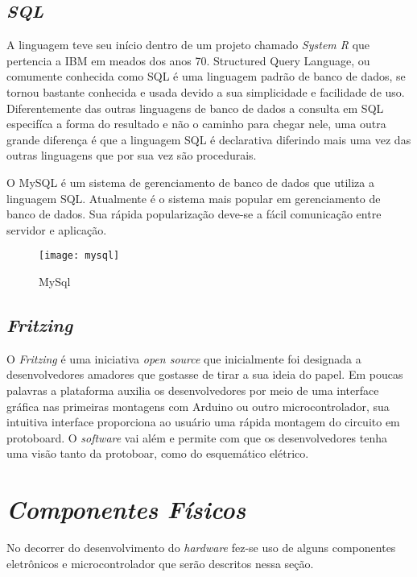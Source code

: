 \subsection[\textit{SQL}]{\textit{SQL}}\label{sql}
A linguagem teve seu início dentro de um projeto chamado \textit{System R} que pertencia a IBM em meados dos anos 70. Structured Query Language, ou
comumente conhecida como SQL é uma linguagem padrão de banco de dados, se tornou bastante conhecida e usada devido a sua simplicidade e facilidade 
de uso. Diferentemente das outras linguagens de banco de dados a consulta em SQL especifíca a forma do resultado e não o caminho para chegar nele, uma outra
grande diferença é que a linguagem SQL é declarativa diferindo mais uma vez das outras linguagens que por sua vez são procedurais.

O MySQL é um sistema de gerenciamento de banco de dados que utiliza a linguagem SQL. Atualmente é o sistema mais popular em gerenciamento de 
banco de dados. Sua rápida popularização deve-se a fácil comunicação entre servidor e aplicação. 

\begin{figure}[h!]
	\texttt{[image: mysql]}
	\centering
	\caption[MySQL]{MySql}
	\label{fig:mysql-image}
\end{figure}
\FloatBarrier

\subsection[\textit{Fritzing}]{\textit{Fritzing}}\label{fritzing}
O \textit{Fritzing} é uma iniciativa \textit{open source} que inicialmente foi
designada a desenvolvedores amadores que gostasse de tirar a sua ideia do papel. Em poucas palavras
a plataforma auxilia os desenvolvedores por meio de uma interface gráfica nas primeiras montagens com Arduino
ou outro microcontrolador, sua intuitiva interface proporciona ao usuário uma rápida montagem do circuito em protoboard. O \textit{software} vai além
e permite com que os desenvolvedores tenha uma visão tanto da protoboar, como do esquemático elétrico. 


\section[\textit{Componentes Físicos}]{\textit{Componentes Físicos}}\label{comp-fisico}
No decorrer do desenvolvimento do \textit{hardware} fez-se uso de alguns componentes eletrônicos e microcontrolador que serão descritos nessa seção.
